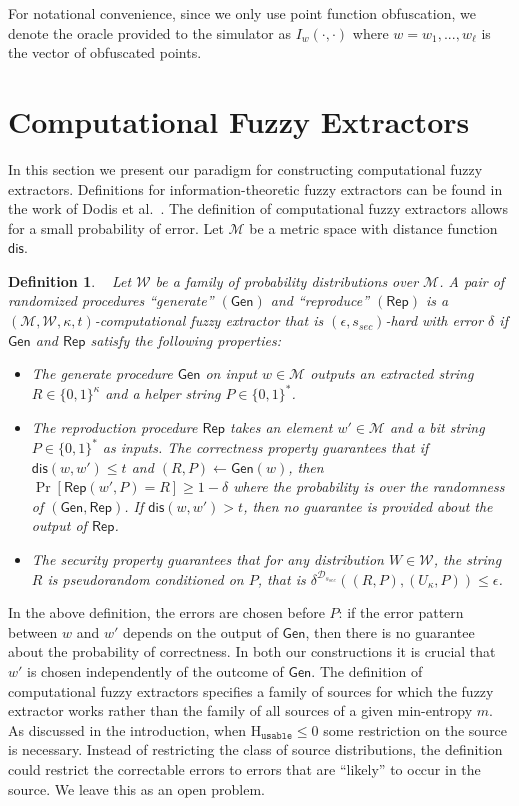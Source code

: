 \documentclass[11pt]{article}
\newcommand{\class}[1]{{\ensuremath{\mathsf{#1}}}}
\newcommand{\gen}{\ensuremath{\class{Gen}}\xspace}
\newcommand{\rep}{\ensuremath{\class{Rep}}\xspace}
\newcommand{\dis}{\ensuremath{\mathsf{dis}}}
\newcommand{\Huse}{\mathrm{H}_{\mathtt{usable}}}
\newtheorem{definition}[theorem]{Definition}
\begin{document}
For notational convenience, since we only use point function obfuscation, we denote the oracle provided to the simulator as $I_w(\cdot, \cdot)$ where $w = w_1,..., w_\ell$ is the vector of obfuscated points.
\section{Computational Fuzzy Extractors}
\label{sec:fuzzy extractors}

In this section we present our paradigm for constructing computational fuzzy extractors.  Definitions for information-theoretic fuzzy extractors can be found in the work of Dodis et al.~\cite[Sections 2.5--4.1]{DBLP:journals/siamcomp/DodisORS08}.  The definition of computational fuzzy extractors allows for a small probability of error.  Let $\mathcal{M}$ be a metric space with distance function $\dis$.

\begin{definition}~\cite[Definition 2.5]{fuller2013computational}
\label{def:comp fuzzy extractor}
Let $\mathcal{W}$ be a family of probability distributions over $\mathcal{M}$. A pair of randomized procedures ``generate'' $(\gen)$ and ``reproduce'' $(\rep)$ is a $(\mathcal{M}, \mathcal{W}, \kappa, t)$-\emph{computational fuzzy extractor} that is $(\epsilon, s_{sec})$-hard with error $\delta$ if \gen and \rep satisfy the following properties:
\begin{itemize}
\item The generate procedure \gen on input $w\in \mathcal{M}$ outputs an extracted string $R\in\{0,1\}^\kappa$ and a helper string $P\in\{0,1\}^*$.
\item The reproduction procedure \rep takes an element $w'\in\mathcal{M}$ and a bit string $P\in\{0,1\}^*$ as inputs.  The \emph{correctness} property guarantees that if $\dis(w, w')\leq t$ and $(R, P)\leftarrow \gen(w)$, then $\Pr[\rep( w', P) = R] \geq 1-\delta$ where the probability is over the randomness of $(\gen, \rep)$.
If $\dis(w, w') > t$, then no guarantee is provided about the output of \rep.
\item The \emph{security} property guarantees that for any distribution $W\in \mathcal{W}$, the string $R$ is pseudorandom conditioned on $P$, that is $\delta^{\mathcal{D}_{s_{sec}}}((R, P), (U_\kappa, P))\leq \epsilon$.
\end{itemize}
\end{definition}
In the above definition, the errors are chosen before $P$: if the error pattern between $w$ and $w'$ depends on the output of $\gen$, then there is no guarantee about the probability of correctness. In both our constructions it is crucial that $w'$ is chosen independently of the outcome of \gen.
The definition of computational fuzzy extractors specifies a family of sources for which the fuzzy extractor works rather than the family of all sources of a given min-entropy $m$.  As discussed in the introduction, when $\Huse\le 0$ some restriction on the source is necessary.  Instead of restricting the class of source distributions, the definition could restrict the correctable errors to errors that are ``likely'' to occur in the source.  We leave this as an open problem.
\end{document}
